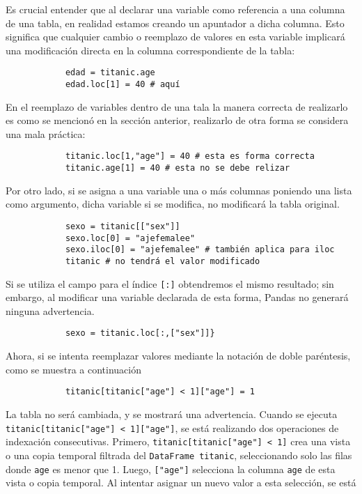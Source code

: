 \noindent Es crucial entender que al declarar una variable como referencia a
una columna de una tabla, en realidad estamos creando un apuntador a dicha
columna. Esto significa que cualquier cambio o reemplazo de valores en esta
variable implicará una modificación directa en la columna correspondiente de la
tabla:
\begin{verbatim}
            edad = titanic.age
            edad.loc[1] = 40 # aquí
            \end{verbatim}
\noindent En el reemplazo de variables dentro de una tala la manera correcta de
realizarlo es como se mencionó en la sección anterior, realizarlo de otra forma
se considera una mala práctica:
\begin{verbatim}
            titanic.loc[1,"age"] = 40 # esta es forma correcta
            titanic.age[1] = 40 # esta no se debe relizar
            \end{verbatim}
\noindent Por otro lado, si se asigna a una variable una o más columnas
poniendo una lista como argumento, dicha variable si se modifica, no modificará
la tabla original.
\begin{verbatim}
            sexo = titanic[["sex"]]
            sexo.loc[0] = "ajefemalee"
            sexo.iloc[0] = "ajefemalee" # también aplica para iloc
            titanic # no tendrá el valor modificado
            \end{verbatim}
\noindent Si se utiliza el campo para el índice \texttt{[:]} obtendremos el
mismo resultado; sin embargo, al modificar una variable declarada de esta
forma, Pandas no generará ninguna advertencia.
\begin{verbatim}
            sexo = titanic.loc[:,["sex"]]}            
            \end{verbatim}
Ahora, si se intenta reemplazar valores mediante la notación de doble
paréntesis, como se muestra a continuación
\begin{verbatim}
            titanic[titanic["age"] < 1]["age"] = 1
            \end{verbatim}
\noindent La tabla no será cambiada, y se mostrará una advertencia. Cuando se
ejecuta \texttt{titanic[titanic["age"] < 1]["age"]}, se está realizando dos
operaciones de indexación consecutivas. Primero, \texttt{titanic[titanic["age"]
            < 1]} crea una vista o una copia temporal filtrada del \texttt{DataFrame
    titanic}, seleccionando solo las filas donde \texttt{age} es menor que 1.
Luego, \texttt{["age"]} selecciona la columna \texttt{age} de esta vista o
copia temporal. Al intentar asignar un nuevo valor a esta selección, se está
